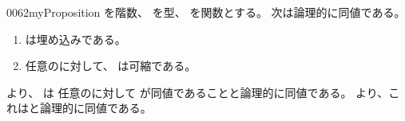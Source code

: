 \documentclass[index]{subfiles}
\begin{document}
\begin{myBlock}{0062}{myProposition}
  を階数、
  を型、
  を関数とする。
  次は論理的に同値である。
  \begin{enumerate}
  \item \label{0062:0000} は埋め込みである。
  \item \label{0062:0001} 任意のに対して、
    は可縮である。
  \end{enumerate}
\end{myBlock}
\begin{myProof}
  より、
  は
  任意のに対して
  が同値であることと論理的に同値である。
  より、これはと論理的に同値である。
\end{myProof}
\end{document}
